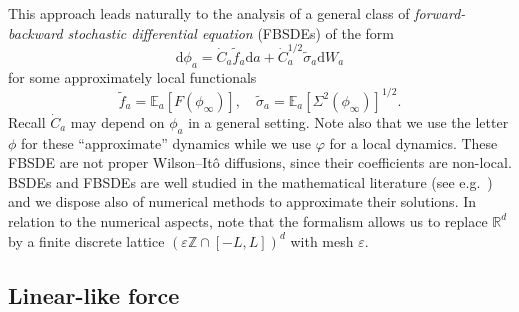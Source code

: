 \documentclass[reprint,aps]{revtex4-2}
\newcommand{\mathd}{\mathrm{d}}
\newcommand{\tmtextit}[1]{\textit{{{#1}}}}
\newcommand{\bbE}{\mathbb{E}}
\begin{document}
This approach leads naturally to the analysis of a general class of
\tmtextit{forward-backward stochastic differential equation} (FBSDEs) of the
form
\begin{equation}
  \mathd \phi_a = \dot{C}_a \tilde{f}_a \mathd a + \dot{C}_a^{1 / 2}
  \tilde{\sigma}_a \mathd W_a \label{eq:approx-sde}
\end{equation}
for some approximately local functionals
\[ \tilde{f}_a = \bbE_a [F (\phi_{\infty})], \quad \tilde{\sigma}_a = \bbE_a
   [\Sigma^2 (\phi_{\infty})]^{1 / 2} . \]
Recall $\dot{C}_a$ may depend on $\phi_a$ in a general setting. Note also that
we use the letter $\phi$ for these ``approximate'' dynamics while we use
$\varphi$ for a local dynamics. These FBSDE are not proper Wilson--It{\^o}
diffusions, since their coefficients are non-local. BSDEs and FBSDEs are well
studied in the mathematical literature (see
e.g.~{\cite{maForwardBackwardStochasticDifferential2007}}) and we dispose also
of numerical methods to approximate their solutions. In relation to the
numerical aspects, note that the formalism allows us to replace $\mathbb{R}^d$
by a finite discrete lattice $(\varepsilon \mathbb{Z} \cap [- L, L])^d$ with
mesh $\varepsilon$.

\subsection{Linear-like force}
\end{document}

